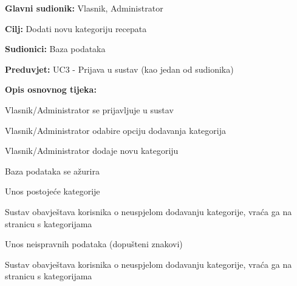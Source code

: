 					\noindent {}
					\begin{packed_item}
	
						\item \textbf{Glavni sudionik: } Vlasnik, Administrator
						\item  \textbf{Cilj:} Dodati novu kategoriju recepata
						\item  \textbf{Sudionici:} Baza podataka
						\item  \textbf{Preduvjet:} UC3 - Prijava u sustav (kao jedan od sudionika)
						\item  \textbf{Opis osnovnog tijeka:}
						
						\item[] \begin{packed_enum}
							
							\item Vlasnik/Administrator se prijavljuje u sustav
							\item Vlasnik/Administrator odabire opciju dodavanja kategorija
							\item Vlasnik/Administrator dodaje novu kategoriju
							\item Baza podataka se ažurira
						\end{packed_enum}

						\item[] \begin{packed_item}
	
							\item[3.a] Unos postojeće kategorije
							\item[] \begin{packed_enum}
								
								\item Sustav obavještava korisnika o neuspjelom dodavanju 
								kategorije, vraća ga na stranicu s kategorijama
								
							\end{packed_enum}

							\item[3.b] Unos neispravnih podataka (dopušteni znakovi)
							\item[] \begin{packed_enum}
								
								\item Sustav obavještava korisnika o neuspjelom dodavanju 
								kategorije, vraća ga na stranicu s kategorijama							\end{packed_enum}
						\end{packed_item}
					\end{packed_item}

